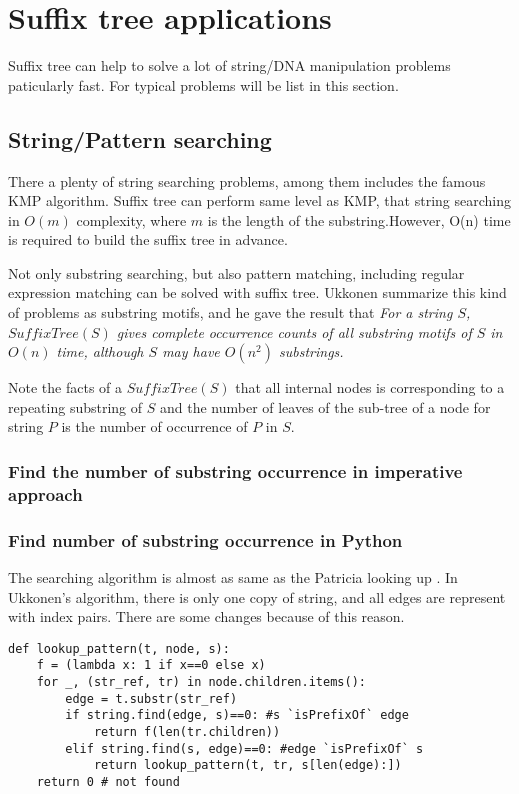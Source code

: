 \documentclass{article}
\begin{document}
\section{Suffix tree applications}

Suffix tree can help to solve a lot of string/DNA manipulation problems
paticularly fast. For typical problems will be list in this section.

\subsection{String/Pattern searching}
\label{substring-lookup}

There a plenty of string searching problems, among them includes the
famous KMP algorithm. Suffix tree can perform same level as 
KMP\cite{zhang-shaojie-lec}, that string searching in $O(m)$ complexity, 
where $m$ is the length of the substring.However, O(n) time is 
required to build the suffix tree in advance\cite{lallison-stree}.

Not only substring searching, but also pattern matching, including
regular expression matching can be solved with suffix tree. Ukkonen
summarize this kind of problems as substring motifs, and he gave the
result that {\em For a string $S$, $SuffixTree(S)$ gives complete occurrence 
counts of all substring motifs of $S$ in $O(n)$ time, although $S$ may have
$O(n^2)$ substrings.}

Note the facts of a $SuffixTree(S)$ that all internal nodes is corresponding
to a repeating substring of $S$ and the number of leaves of the sub-tree of a
node for string $P$ is the number of occurrence of $P$ in $S$.\cite{ukkonen-lec}

\subsubsection{Find the number of substring occurrence in imperative approach}

\subsubsection*{Find number of substring occurrence in Python}

The searching algorithm is almost as same as the Patricia looking 
up \cite{lxy-trie}. In Ukkonen's algorithm, there is only one copy
of string, and all edges are represent with index pairs. There are
some changes because of this reason. 

\lstset{language=Python}
\begin{lstlisting}
def lookup_pattern(t, node, s):
    f = (lambda x: 1 if x==0 else x)
    for _, (str_ref, tr) in node.children.items():
        edge = t.substr(str_ref)
        if string.find(edge, s)==0: #s `isPrefixOf` edge
            return f(len(tr.children))
        elif string.find(s, edge)==0: #edge `isPrefixOf` s
            return lookup_pattern(t, tr, s[len(edge):])
    return 0 # not found
\end{lstlisting}
\end{document}

